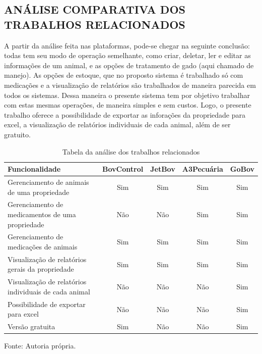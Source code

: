 



\subsection{ANÁLISE COMPARATIVA DOS TRABALHOS RELACIONADOS}

A partir da análise feita nas plataformas, pode-se chegar na seguinte conclusão: todas tem seu modo de operação semelhante, como criar, deletar, ler e editar as informações de um animal, e as opções de tratamento de gado (aqui chamado de manejo). As opções de estoque, que no proposto sistema é trabalhado só com medicações e a visualização de relatórios são trabalhados de maneira parecida em todos os sistemas. Dessa maneira o presente sistema tem por objetivo trabalhar com estas mesmas operações, de maneira simples e sem custos. Logo, o presente trabalho oferece a possibilidade de exportar as inforações da propriedade para excel, a visualização de relatórios individuais de cada animal, além de ser gratuito.


\begin{table}[H]
	\begin{center}
		\caption{Tabela da análise dos trabalhos relacionados}
		\begin{tabular}{ | p{8cm} |  c | c | c | c |}
			\hline
			Funcionalidade & BovControl & JetBov & A3Pecuária & GoBov \\ \hline
			Gerenciamento de animais de uma propriedade & Sim & Sim & Sim & Sim \\  \hline
			Gerenciamento de medicamentos de uma propriedade & Não & Não & Sim & Sim  \\ \hline
			Gerenciamento de medicações de animais & Sim & Sim & Sim & Sim  \\ \hline
			Visualização de relatórios gerais da propriedade & Sim & Sim & Sim & Sim  \\ \hline
			Visualização de relatórios individuais de cada animal & Não & Não & Não & Sim  \\ \hline
			Possibilidade de exportar para excel & Não & Não & Não & Sim  \\ \hline
			Versão gratuita & Sim & Não & Não & Sim  \\
			\hline
		\end{tabular}
		Fonte: Autoria própria.
	\end{center}
\end{table}



